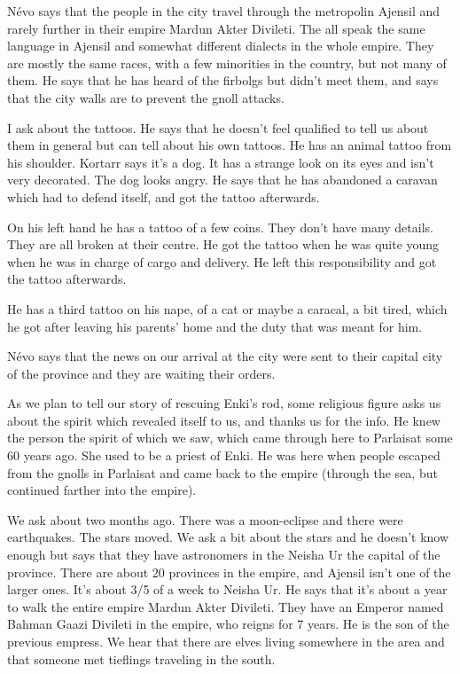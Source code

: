 \documentclass[10pt,a4paper,twoside,openany,hidelinks]{book}
\begin{document}
Névo says that the people in the city travel through the metropolin Ajensil and rarely further in their empire Mardun Akter Divileti. The all speak the same language in Ajensil and somewhat different dialects in the whole empire. They are mostly the same races, with a few minorities in the country, but not many of them. He says that he has heard of the firbolgs but didn't meet them, and says that the city walls are to prevent the gnoll attacks.

I ask about the tattoos. He says that he doesn't feel qualified to tell us about them in general but can tell about his own tattoos. He has an animal tattoo from his shoulder. Kortarr says it's a dog. It has a strange look on its eyes and isn't very decorated. The dog looks angry. He says that he has abandoned a caravan which had to defend itself, and got the tattoo afterwards.

On his left hand he has a tattoo of a few coins. They don't have many details. They are all broken at their centre. He got the tattoo when he was quite young when he was in charge of cargo and delivery. He left this responsibility and got the tattoo afterwards. 

He has a third tattoo on his nape, of a cat or maybe a caracal, a bit tired, which he got after leaving his parents' home and the duty that was meant for him.

Névo says that the news on our arrival at the city were sent to their capital city of the province and they are waiting their orders.

As we plan to  tell our story of rescuing Enki's rod, some religious figure asks us about the spirit which revealed itself to us, and thanks us for the info.
He knew the person the spirit of which we saw, which came through here to Parlaisat some 60 years ago. She used to be a priest of Enki. He was here when people escaped from the gnolls in Parlaisat and came back to the empire (through the sea, but continued farther into the empire).

We ask about two months ago. There was a moon-eclipse and there were earthquakes. The stars moved. We ask a bit about the stars and he doesn't know enough but says that they have astronomers in the Neisha Ur the capital of the province. There are about 20 provinces in the empire, and Ajensil isn't one of the larger ones. It's about 3/5 of a week to Neisha Ur.
He says that it's about a year to walk the entire empire Mardun Akter Divileti.
They have an Emperor named Bahman Gaazi Divileti in the empire, who reigns for 7 years. He is the son of the previous empress.
We hear that there are elves living somewhere in the area and that someone met tieflings traveling in the south.
\end{document}
